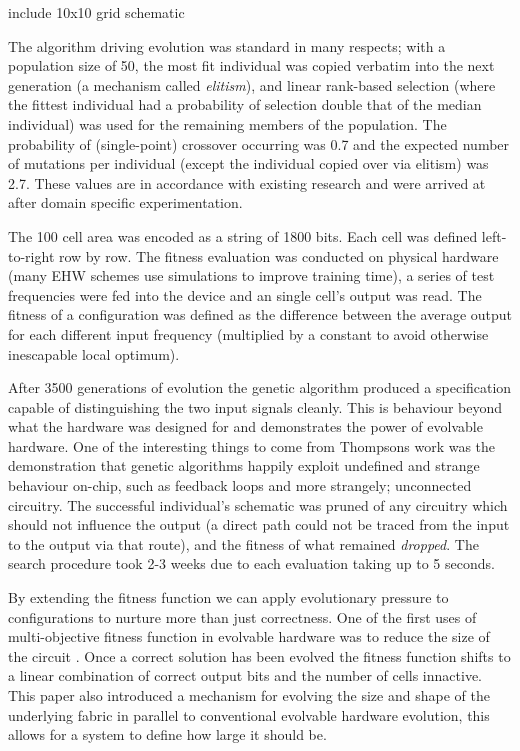 \todo include 10x10 grid schematic

The algorithm driving evolution was standard in many respects; with a population size of 50,
the most fit individual was copied verbatim into the next generation (a mechanism
called {\em elitism}), and linear rank-based selection (where the fittest
individual had a probability of selection double that of the median individual)
was used for the remaining members of the population. The probability of (single-point)
crossover occurring was 0.7 and the expected number of mutations per individual
(except the individual copied over via elitism) was 2.7. These values are in
accordance with existing research and were arrived at after domain specific
experimentation.

The 100 cell area was encoded as a string of 1800 bits. Each cell was defined
left-to-right row by row. The fitness evaluation was conducted on physical hardware
(many EHW schemes use simulations to improve training time), a series of test frequencies
were fed into the device and an single cell's output was read. The fitness of a configuration
was defined as the difference between the average output for each different input frequency
(multiplied by a constant to avoid otherwise inescapable local optimum).

After 3500 generations of evolution the genetic algorithm produced a specification
capable of distinguishing the two input signals cleanly. This is behaviour beyond
what the hardware was designed for and demonstrates the power of evolvable hardware. One of the
interesting things to come from Thompsons work was the demonstration that genetic
algorithms happily exploit undefined and strange behaviour on-chip, such as feedback
loops and more strangely; unconnected circuitry. The successful
individual's schematic was pruned of any circuitry which should not influence the
output (a direct path could not be traced from the input to the output via that route),
and the fitness of what remained {\em dropped}. The search procedure took 2-3 weeks
due to each evaluation taking up to 5 seconds.

By extending the fitness function we can apply evolutionary pressure to configurations
to nurture more than just correctness.
One of the first uses of multi-objective fitness function in evolvable hardware was
to reduce the size of the circuit \cite{785435}. Once a correct solution has been evolved the
fitness function shifts to a linear combination of correct output bits and
the number of cells innactive. This paper also introduced a mechanism for evolving the size
and shape of the underlying fabric in parallel to conventional evolvable hardware
evolution, this allows for a system to define
how large it should be.

